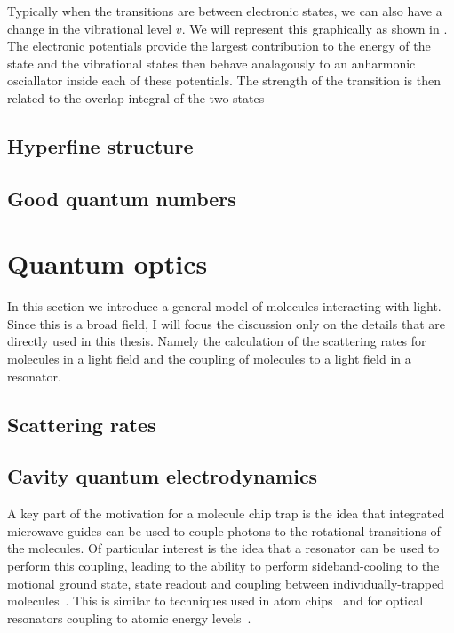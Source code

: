 Typically when the transitions are between electronic states, we can also have
a change in the vibrational level $v$. We will represent this graphically as
shown in . The electronic potentials provide the largest
contribution to the energy of the state and the vibrational states then behave
analagously to an anharmonic osciallator inside each of these potentials. The
strength of the transition is then related to the overlap integral of the two
states

\subsection{Hyperfine structure}


\subsection{Good quantum numbers}




\section{Quantum optics}
\label{theory:QO}

In this section we introduce a general model of molecules interacting with
light.  Since this is a broad field, I will focus the discussion only on the
details that are directly used in this thesis.  Namely the calculation of the
scattering rates for molecules in a light field and the coupling of molecules
to a light field in a resonator.


\subsection{Scattering rates}


\subsection{Cavity quantum electrodynamics}

A key part of the motivation for a molecule chip trap is the idea that
integrated microwave guides can be used to couple photons to the rotational
transitions of the molecules. Of particular interest is the idea
that a resonator can be used to perform this coupling, leading to the
ability to perform sideband-cooling to the motional ground state, state readout
and coupling between individually-trapped molecules~\cite{Andre2006}. This is
similar to techniques used in atom chips~\cite{Treutlein2008} and for optical
resonators coupling to atomic energy levels~\cite{SchleierSmith2011}.

